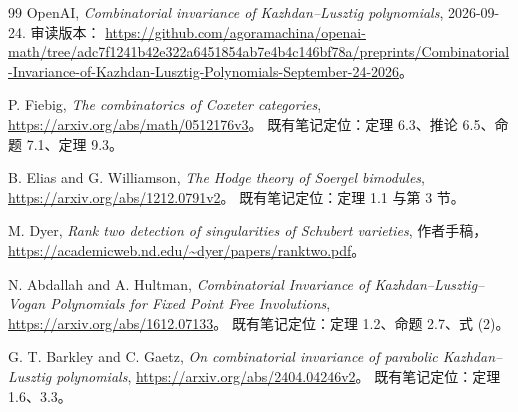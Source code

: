 \begin{thebibliography}{99}
OpenAI, \emph{Combinatorial invariance of Kazhdan--Lusztig polynomials}, 2026-09-24.
审读版本：
\url{https://github.com/agoramachina/openai-math/tree/adc7f1241b42e322a6451854ab7e4b4c146bf78a/preprints/Combinatorial-Invariance-of-Kazhdan-Lusztig-Polynomials-September-24-2026}。

P. Fiebig, \emph{The combinatorics of Coxeter categories},
\url{https://arxiv.org/abs/math/0512176v3}。
既有笔记定位：定理 6.3、推论 6.5、命题 7.1、定理 9.3。

B. Elias and G. Williamson, \emph{The Hodge theory of Soergel bimodules},
\url{https://arxiv.org/abs/1212.0791v2}。
既有笔记定位：定理 1.1 与第 3 节。

M. Dyer, \emph{Rank two detection of singularities of Schubert varieties}, 作者手稿，
\url{https://academicweb.nd.edu/~dyer/papers/ranktwo.pdf}。

N. Abdallah and A. Hultman, \emph{Combinatorial Invariance of Kazhdan--Lusztig--Vogan Polynomials for Fixed Point Free Involutions},
\url{https://arxiv.org/abs/1612.07133}。
既有笔记定位：定理 1.2、命题 2.7、式 (2)。

G. T. Barkley and C. Gaetz, \emph{On combinatorial invariance of parabolic Kazhdan--Lusztig polynomials},
\url{https://arxiv.org/abs/2404.04246v2}。
既有笔记定位：定理 1.6、3.3。
\end{thebibliography}
